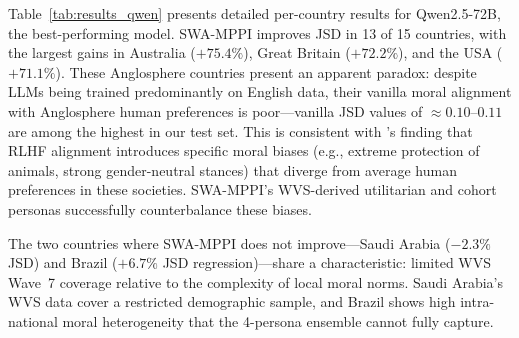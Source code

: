 \documentclass{article}
\begin{document}
Table~\ref{tab:results_qwen} presents detailed per-country results for Qwen2.5-72B, the
best-performing model. SWA-MPPI improves JSD in 13 of 15 countries, with the largest
gains in Australia ($+75.4\%$), Great Britain ($+72.2\%$), and the USA ($+71.1\%$).
These Anglosphere countries present an apparent paradox: despite LLMs being trained
predominantly on English data, their vanilla moral alignment with Anglosphere human
preferences is poor---vanilla JSD values of $\approx 0.10$--$0.11$ are among the highest
in our test set. This is consistent with \citet{jin2025multitp}'s finding that RLHF
alignment introduces specific moral biases (e.g., extreme protection of animals, strong
gender-neutral stances) that diverge from average human preferences in these societies.
SWA-MPPI's WVS-derived utilitarian and cohort personas successfully counterbalance
these biases.

The two countries where SWA-MPPI does not improve---Saudi Arabia ($-2.3\%$ JSD) and
Brazil ($+6.7\%$ JSD regression)---share a characteristic: limited WVS Wave~7 coverage
relative to the complexity of local moral norms. Saudi Arabia's WVS data cover a
restricted demographic sample, and Brazil shows high intra-national moral heterogeneity
that the 4-persona ensemble cannot fully capture.
\end{document}
